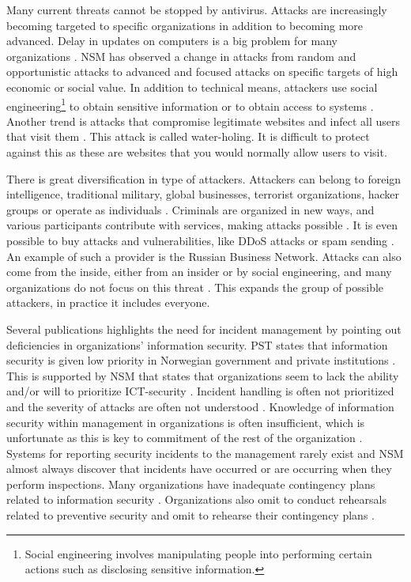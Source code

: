 Many current threats cannot be stopped by antivirus. Attacks are increasingly becoming targeted to specific organizations in addition to becoming more advanced. Delay in updates on computers is a big problem for many organizations \cite{NorCERT2Kvartal2012}. \acs{NSM} has observed a change in attacks from random and opportunistic attacks to advanced and focused attacks on specific targets of high economic or social value. In addition to technical means, attackers use social engineering\footnote{Social engineering involves manipulating people into performing certain actions such as disclosing sensitive information.} to obtain sensitive information or to obtain access to systems \cite{NSMRapport}. Another trend is attacks that compromise legitimate websites and infect all users that visit them \cite{NSMRapport2012}. This attack is called water-holing. It is difficult to protect against this as these are websites that you would normally allow users to visit.

There is great diversification in type of attackers. Attackers can belong to foreign intelligence, traditional military, global businesses, terrorist organizations, hacker groups or operate as individuals \cite{samordnaVurdering}. Criminals are organized in new ways, and various participants contribute with services, making attacks possible \cite{KriposTrender}. It is even possible to buy attacks and vulnerabilities, like \ac{DDoS} attacks or spam sending \cite{NorCERT2Kvartal2012}. An example of such a provider is the Russian Business Network. Attacks can also come from the inside, either from an insider or by social engineering, and many organizations do not focus on this threat \cite{NSMRapport2012}. This expands the group of possible attackers, in practice it includes everyone. 

Several publications highlights the need for incident management by pointing out deficiencies in organizations' information security. PST states that information security is given low priority in Norwegian government and private institutions \cite{PSTvurdering}. This is supported by \acs{NSM} that states that organizations seem to lack the ability and/or will to prioritize ICT-security \cite{NSMmelding}. Incident handling is often not prioritized and the severity of attacks are often not understood \cite{NorCERT2Kvartal2012}. Knowledge of information security within management in organizations is often insufficient, which is unfortunate as this is key to commitment of the rest of the organization \cite{NorCERT3Kvartal2012}. Systems for reporting security incidents to the management rarely exist and \acs{NSM} almost always discover that incidents have occurred or are occurring when they perform inspections. Many organizations have inadequate contingency plans related to information security \cite{NSMRapport}. Organizations also omit to conduct rehearsals related to preventive security and omit to rehearse their contingency plans \cite{NSMRapport2012}.

